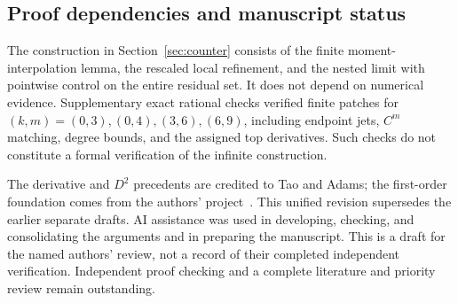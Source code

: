 \documentclass[11pt,reqno]{amsart}
\numberwithin{equation}{section}
\theoremstyle{definition}
\theoremstyle{remark}
\begin{document}
\subsection{Proof dependencies and manuscript status}
The construction in Section~\ref{sec:counter} consists of the finite moment-interpolation lemma, the rescaled local refinement, and the nested limit with pointwise control on the entire residual set. It does not depend on numerical evidence. Supplementary exact rational checks verified finite patches for $(k,m)=(0,3),(0,4),(3,6),(6,9)$, including endpoint jets, $C^m$ matching, degree bounds, and the assigned top derivatives. Such checks do not constitute a formal verification of the infinite construction.

The derivative and $D^2$ precedents are credited to Tao and Adams; the first-order foundation comes from the authors' project~\cite{project}. This unified revision supersedes the earlier separate drafts. AI assistance was used in developing, checking, and consolidating the arguments and in preparing the manuscript. This is a draft for the named authors' review, not a record of their completed independent verification. Independent proof checking and a complete literature and priority review remain outstanding.
\end{document}
